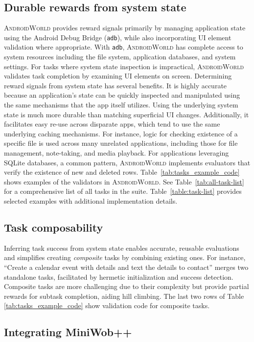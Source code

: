 \documentclass{article}
\newcommand{\system}{\textsc{AndroidWorld}\xspace}
\begin{document}
\subsection{Durable rewards from system state}

\system provides reward signals primarily by managing application state using the Android Debug Bridge (\texttt{adb}), while also incorporating UI element validation where appropriate. With \texttt{adb}, \system has complete access to system resources including the file system, application databases, and system settings. For tasks where system state inspection is impractical, \system validates task completion by examining UI elements on screen. Determining reward signals from system state has several benefits. It is highly accurate because an application's state can be quickly inspected and manipulated using the same mechanisms that the app itself utilizes. Using the underlying system state is much more durable than matching superficial UI changes. Additionally, it facilitates easy re-use across disparate apps, which tend to use the same underlying caching mechanisms. For instance, logic for checking existence of a specific file is used across many unrelated applications, including those for file management, note-taking, and media playback. For applications leveraging SQLite databases, a common pattern, \system implements evaluators that verify the existence of new and deleted rows. Table~\ref{tab:tasks_example_code} shows examples of the validators in \system. See Table~\ref{tab:all-task-list} for a comprehensive list of all tasks in the suite. Table~\ref{table:task-list} provides selected examples with additional implementation details.

\subsection{Task composability}
Inferring task success from system state enables accurate, reusable evaluations and simplifies creating \textit{composite} tasks by combining existing ones. For instance, ``Create a calendar event with {details} and text the details to {contact}” merges two standalone tasks, facilitated by hermetic initialization and success detection. Composite tasks are more challenging due to their complexity but provide partial rewards for subtask completion, aiding hill climbing. The last two rows of Table \ref{tab:tasks_example_code} show validation code for composite tasks.

\subsection{Integrating MiniWob++}
\end{document}
